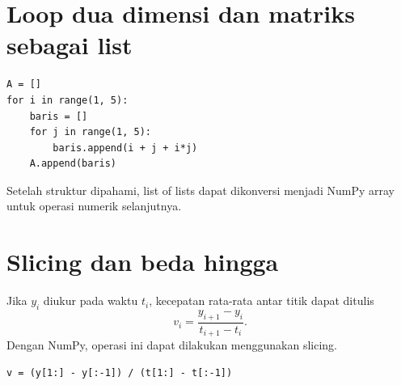 \documentclass[11pt,a4paper]{report}
\begin{document}
\section{Loop dua dimensi dan matriks sebagai list}
\begin{lstlisting}
A = []
for i in range(1, 5):
    baris = []
    for j in range(1, 5):
        baris.append(i + j + i*j)
    A.append(baris)
\end{lstlisting}
Setelah struktur dipahami, list of lists dapat dikonversi menjadi NumPy array untuk operasi numerik selanjutnya.

\section{Slicing dan beda hingga}
Jika $y_i$ diukur pada waktu $t_i$, kecepatan rata-rata antar titik dapat ditulis
\[
v_i=\frac{y_{i+1}-y_i}{t_{i+1}-t_i}.
\]
Dengan NumPy, operasi ini dapat dilakukan menggunakan slicing.
\begin{lstlisting}
v = (y[1:] - y[:-1]) / (t[1:] - t[:-1])
\end{lstlisting}
\end{document}
